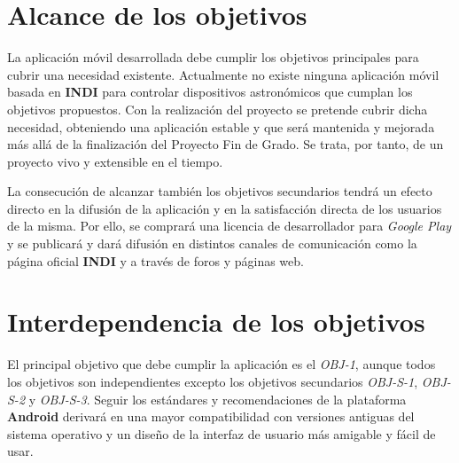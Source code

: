 \section{Alcance de los objetivos}

La aplicación móvil desarrollada debe cumplir los objetivos principales para cubrir una necesidad existente. Actualmente no existe ninguna aplicación móvil basada en \textbf{INDI} para controlar dispositivos astronómicos que cumplan los objetivos propuestos. Con la realización del proyecto se pretende cubrir dicha necesidad, obteniendo una aplicación estable y que será mantenida y mejorada más allá de la finalización del Proyecto Fin de Grado. Se trata, por tanto, de un proyecto vivo y extensible en el tiempo.

\bigskip
La consecución de alcanzar también los objetivos secundarios tendrá un efecto directo en la difusión de la aplicación y en la satisfacción directa de los usuarios de la misma. Por ello, se comprará una licencia de desarrollador para \textit{Google Play} y se publicará y dará difusión en distintos canales de comunicación como la página oficial \textbf{INDI} y a través de foros y páginas web.


\section{Interdependencia de los objetivos}

El principal objetivo que debe cumplir la aplicación es el \textit{OBJ-1}, aunque todos los objetivos son independientes excepto los objetivos secundarios \textit{OBJ-S-1}, \textit{OBJ-S-2} y \textit{OBJ-S-3}. Seguir los estándares y recomendaciones de la plataforma \textbf{Android} derivará en una mayor compatibilidad con versiones antiguas del sistema operativo y un diseño de la interfaz de usuario más amigable y fácil de usar. 